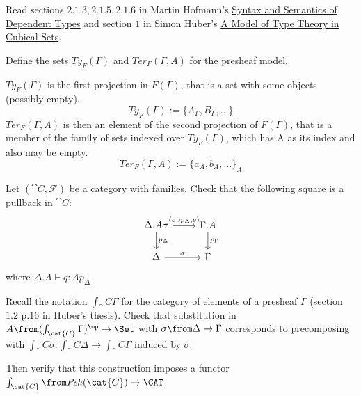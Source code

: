 \def\pathToRoot{../../}



\author{Nikita Ziuzin}

\begin{hint}
  Read sections $2.1.3, 2.1.5, 2.1.6$ in Martin Hofmann's \href{http://www.irif.fr/~mellies/mpri/mpri-ens/articles/hofmann-syntax-and-semantics-of-dependent-types.pdf}{Syntax and Semantics of Dependent Types} and section $1$ in Simon Huber's \href{http://www.cse.chalmers.se/~simonhu/misc/lic.pdf}{A Model of Type Theory in Cubical Sets}.
\end{hint}

\begin{exercise}
  Define the sets $\mathit{Ty}_F(\Gamma)$ and $\mathit{Ter}_F(\Gamma, A)$ for the presheaf model.
\end{exercise}
\begin{answer}
  $\mathit{Ty}_F(\Gamma)$ is the first projection in $F(\Gamma)$, that is a set with some
  objects (possibly empty).
  \[
    \mathit{Ty}_F(\Gamma) := \{A_\Gamma, B_\Gamma, \dots\}
  \]
  $\mathit{Ter}_F(\Gamma, A)$ is then an element of the second projection of $F(\Gamma)$,
  that is a member of the family of sets indexed over $\mathit{Ty}_F(\Gamma)$, which has
  A as its index and also may be empty.
  \[
    \mathit{Ter}_F(\Gamma, A) := \{a_A, b_A, \dots\}_A
  \]
\end{answer}

\begin{exercise}
  Let $(\cat C, \mathcal F)$ be a category with families.
  Check that the following square is a pullback in $\cat{C}$:
  \[
    \begin{tikzcd}
      \Delta.A\sigma \arrow{r}{(\sigma \circ p_\Delta, q)} \arrow{d}{p_\Delta} & \Gamma.A \arrow{d}{p_\Gamma}\\
      \Delta \arrow{r}{\sigma} & \Gamma
    \end{tikzcd}
  \]
  where $\Delta.A \vdash q : A p_\Delta$
\end{exercise}

\begin{exercise}
  Recall the notation $\int_\cat{C}\Gamma$ for the category of elements of a presheaf $\Gamma$ (section $1.2$ p.$16$ in Huber's thesis).
  Check that substitution in $A\from (\int_\cat{C}\Gamma)^\op \to \Set$ with $\sigma \from \Delta \to \Gamma$ corresponds to precomposing with $\int_\cat{C} \sigma : \int_\cat{C} \Delta \to \int_\cat{C} \Gamma$ induced by $\sigma$.

  Then verify that this construction imposes a functor $\int_\cat{C} \from \mathit{Psh}(\cat{C}) \to \CAT$.
\end{exercise}
\begin{answer}
\end{answer}

